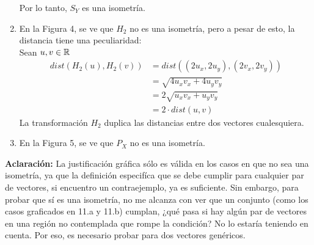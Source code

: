 \begin{mdframed}[style=s]
\begin{enumerate}
                Por lo tanto, $S_Y$ es una isometría.
            \item En la Figura 4, se ve que $H_2$ no es una isometría, pero a pesar de esto, la distancia tiene una peculiaridad:\\
                Sean $u,v\in\mathbb{R}$
                \begin{align*}
                    dist(H_2(u),H_2(v))&=dist((2u_x,2u_y),(2v_x,2v_y))\\
                    &=\sqrt{4u_xv_x+4u_yv_y}\\
                    &=2\sqrt{u_xv_x+u_yv_y}\\
                    &=2\cdot dist(u,v)
                \end{align*}
                La transformación $H_2$ duplica las distancias entre dos vectores cualesquiera.
            \item En la Figura 5, se ve que $P_X$ no es una isometría.
        \end{enumerate}
        \textbf{Aclaración:} La justificación gráfica sólo es válida en los casos en que no sea una isometría, ya que la definición especifíca que se debe cumplir para cualquier par de vectores, si encuentro un contraejemplo, ya es suficiente. Sin embargo, para probar que sí es una isometría, no me alcanza con ver que un conjunto (como los casos graficados en 11.a y 11.b) cumplan, ¿qué pasa si hay algún par de vectores en una región no contemplada que rompe la condición? No lo estaría teniendo en cuenta. Por eso, es necesario probar para dos vectores genéricos.
    \end{mdframed}